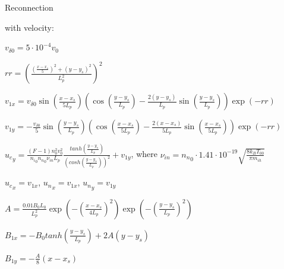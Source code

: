 \documentclass{beamer}
\begin{document}



\begin{frame}{Reconnection}


with velocity:

$v_{\delta0} = 5 \cdot 10^{-4}  v_0$

$rr = \left( \frac{ (\frac{x-x_s}{5})^2 + (y-y_s)^2}{L_p^2} \right )^2$

$v_{1x} = v_{\delta0}  \sin \left ( \frac{x-x_s}{5 L_p} \right ) \left (\cos( \frac{y-y_s}{L_p}) - \frac{2(y-y_s)}{L_p} \sin ( \frac{y-y_s}{L_p}) \right) \exp(-rr)$

$v_{1y} = -\frac{v_{\delta0}}{5}  \sin \left ( \frac{y-y_s}{L_p} \right ) \left (\cos( \frac{x-x_s}{5 L_p}) - \frac{2(x-x_s)}{5 L_p} \sin ( \frac{x-x_s}{5 L_p}) \right) \exp(-rr)$



${u_c}_y = \frac{ (F-1)n_0^2 v_0^2}{{n_i}_0 {n_n}_0 \nu_{in}  L_p}  \frac{tanh (\frac{y-y_s}{L_p}) } {(cosh(\frac{y-y_s}{L_p}))^2}+ v_{1y}$,
where 
$\nu_{in} = {n_n}_0 \cdot 1.41 \cdot 10^{-19} \sqrt{ \frac{8 k_B T_{00}}{\pi m_{ih}}} $

${u_c}_x = v_{1x}$,
${u_n}_x = v_{1x}$,
${u_n}_y = v_{1y}$


$A = \frac{0.01  B_0  L_0}{ L_p^2}  \exp \left(-( \frac{x-x_s}{4 L_p})^2 \right )  \exp \left (-( \frac{y-y_s}{L_p})^2 \right)$

$B_{1x} = -B_0  tanh ( \frac{y-y_s}{L_p}) +2 A  (y-y_s)$

$B_{1y} = -\frac{A}{8}  (x-x_s) $




\end{frame}




\end{document}
